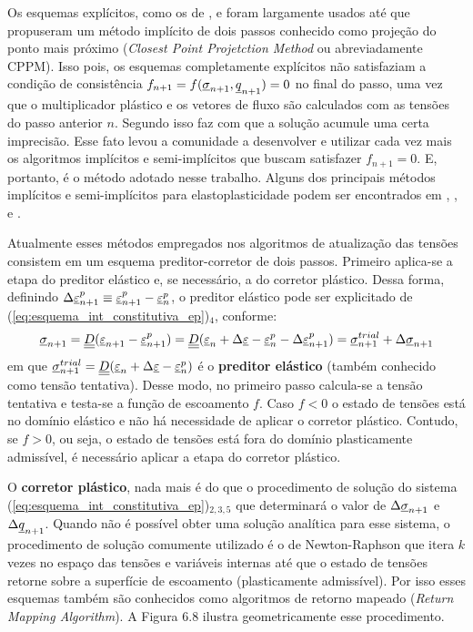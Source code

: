 Os esquemas explícitos, como os de ,  e  foram largamente usados até que  propuseram um método implícito de dois passos conhecido como projeção do ponto mais próximo (\textit{Closest Point Projetction Method} ou abreviadamente CPPM). Isso pois, os esquemas completamente explícitos não satisfaziam a condição de consistência $f_{n+1} = f(\underline \sigma_{n+1},\underline q_{n+1}) = 0$ no final do passo, uma vez que o multiplicador plástico e os vetores de fluxo são calculados com as tensões do passo anterior $n$. Segundo  isso faz com que a solução acumule uma certa imprecisão. Esse fato levou a comunidade a desenvolver e utilizar cada vez mais os algoritmos implícitos e semi-implícitos que buscam satisfazer $f_{n+1} = 0$. E, portanto, é o método adotado nesse trabalho. Alguns dos principais métodos implícitos e semi-implícitos para elastoplasticidade podem ser encontrados em , ,  e .

Atualmente esses métodos empregados nos algoritmos de atualização das tensões consistem em um esquema preditor-corretor de dois passos. Primeiro aplica-se a etapa do preditor elástico e, se necessário, a do corretor plástico. Dessa forma, definindo $\Delta \underline{\varepsilon}_{n+1}^p \equiv \underline{\varepsilon}_{n+1}^p - \underline{\varepsilon}_{n}^p$, o preditor elástico pode ser explicitado de (\ref{eq:esquema_int_constitutiva_ep})$_4$, conforme:
\begin{equation}
	\label{eq:preditor_elastico}
	\underline \sigma_{n+1} = \underline{\underline D}(\underline{\varepsilon}_{n+1}-\underline{\varepsilon}_{n+1}^p) = \underline{\underline D}(\underline{\varepsilon}_n+\Delta \underline{\varepsilon}-\underline{\varepsilon}_{n}^ p-\Delta \underline{\varepsilon}_{n+1}^p) = \underline \sigma_{n+1}^{trial} + \Delta \underline \sigma_{n+1}
\end{equation}
em que $\underline \sigma_{n+1}^{trial} = \underline{\underline D}(\underline{\varepsilon}_n+\Delta \underline{\varepsilon}-\underline{\varepsilon}_{n}^ p)$ é o \textbf{preditor elástico} (também conhecido como tensão tentativa). Desse modo, no primeiro passo calcula-se a tensão tentativa e testa-se a função de escoamento $f$. Caso $f<0$ o estado de tensões está no domínio elástico e não há necessidade de aplicar o corretor plástico. Contudo, se $f>0$, ou seja, o estado de tensões está fora do domínio plasticamente admissível, é necessário aplicar a etapa do corretor plástico.

O \textbf{corretor plástico}, nada mais é do que o procedimento de solução do sistema (\ref{eq:esquema_int_constitutiva_ep})$_{2,3,5}$ que determinará o valor de $\Delta \underline \sigma_{n+1}$ e $\Delta \underline q_{n+1}$. Quando não é possível obter uma solução analítica para esse sistema, o procedimento de solução comumente utilizado é o de Newton-Raphson que itera $k$ vezes no espaço das tensões e variáveis internas até que o estado de tensões retorne sobre a superfície de escoamento (plasticamente admissível). Por isso esses esquemas também são conhecidos como algoritmos de retorno mapeado (\textit{Return Mapping Algorithm}). A Figura 6.8 ilustra geometricamente esse procedimento.

